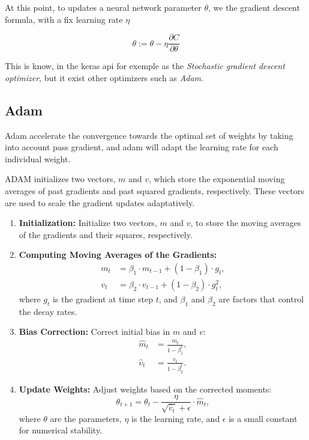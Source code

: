 \documentclass[a4paper, twocolumn, twoside]{article}
\begin{document}
	At this point, to updates a neural network parameter $\theta$, we the gradient descent formula,
	with a fix learning rate $\eta$

	$$
	\theta := \theta - \eta \frac{\partial C}{\partial \theta}
	$$

	This is know, in the keras api for exemple as the \textit{Stochastic gradient descent optimizer},
	but it exist other optimizers such as \textit{Adam}.

	\subsection{Adam}
	Adam accelerate the convergence towards the optimal set of weights by taking into account pass gradient,
	and adam will adapt the learning rate for each individual weight.

	ADAM initializes two vectors, 
	$m$ and $v$, which store the exponential moving averages of past gradients and past squared gradients,
	respectively. These vectors are used to scale the gradient updates adaptatively.

	\begin{enumerate}
	  \item \textbf{Initialization:} Initialize two vectors, $m$ and $v$, to store the moving averages of the gradients and their squares, respectively.
	  \item \textbf{Computing Moving Averages of the Gradients:}
		\begin{align*}
		  m_t &= \beta_1 \cdot m_{t-1} + (1 - \beta_1) \cdot g_t, \\
		  v_t &= \beta_2 \cdot v_{t-1} + (1 - \beta_2) \cdot g_t^2,
		\end{align*}
		where $g_t$ is the gradient at time step $t$, and $\beta_1$ and $\beta_2$ are factors that control the decay rates.
	  \item \textbf{Bias Correction:} Correct initial bias in $m$ and $v$:
		\begin{align*}
		  \hat{m}_t &= \frac{m_t}{1 - \beta_1^t}, \\
		  \hat{v}_t &= \frac{v_t}{1 - \beta_2^t}.
		\end{align*}
	  \item \textbf{Update Weights:} Adjust weights based on the corrected moments:
		\begin{equation*}
		  \theta_{t+1} = \theta_t - \frac{\eta}{\sqrt{\hat{v}_t} + \epsilon} \cdot \hat{m}_t,
		\end{equation*}
		where $\theta$ are the parameters, $\eta$ is the learning rate, and $\epsilon$ is a small constant for numerical stability.
	\end{enumerate}
\end{document}
